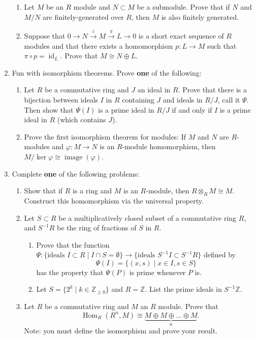 \documentclass[12pt]{article}
\newcommand{\bbZ}{\mathbb{Z}}
\newcommand{\Hom}{\operatorname{Hom}}
\begin{document}
\begin{enumerate}
\begin{enumerate}
\item Let $M$ be an $R$ module and $N\subset M$ be a submodule. Prove
  that if $N$ and $M/N$ are finitely-generated over $R$, then $M$ is
  also finitely generated. 
\item Suppose that $0 \rightarrow N \xrightarrow{i} M \xrightarrow{\pi} L
  \rightarrow 0$ is a short exact sequence of $R$ modules and that
  there exists a homomorphism $p: L\rightarrow M$ such that $\pi \circ
  p = \operatorname{id}_L$. Prove that $M\cong N\oplus L$. 
\end{enumerate}
\item Fun with isomorphism theorems. Prove {\bf one} of the following: 
\begin{enumerate}
\item Let $R$ be a commutative ring and $J$ an ideal in $R$. Prove that there is a bijection between ideals
  $I$ in $R$ containing $J$ and ideals in $R/J$, call it $\Psi$. Then
  show that $\Psi(I)$ is a prime ideal in $R/J$ if and only if
  $I$ is a prime ideal in $R$ (which contains $J$). 
\item Prove the first isomorphism theorem for modules: If $M$ and $N$
  are $R$-modules and $\varphi: M\rightarrow N$ is an $R$-module
  homomorphism, then $M/\ker \varphi \cong
  \operatorname{image}(\varphi)$. 
\end{enumerate}
\item Complete {\bf one} of the following problems: 
\begin{enumerate}
\item Show that if $R$ is a ring and $M$ is an $R$-module, then
  $R\otimes_R M\cong M$. Construct this homomorphism via the universal
  property. 
\item Let $S\subset R$ be a multiplicatively closed subset of a
  commutative ring $R$, and $S^{-1}R$ be the ring of fractions of $S$
  in $R$.
  \begin{enumerate}
  \item Prove that the function $\Psi: \{\textrm{ideals } I \subset R
    \mid I \cap S = \emptyset\}\rightarrow \{\textrm{ideals } S^{-1}I
    \subset S^{-1}R\}$ defined by \[\Psi(I) = \{(x,s) \mid x\in I,
      s\in S\}\] has the property that $\Psi(P)$ is prime whenever $P$
    is. 
  \item Let $S=\{2^k \mid k\in \bbZ_{\geq 0}\}$ and $R=\bbZ$. List the
    prime ideals in $S^{-1}\bbZ$. 
  \end{enumerate}
\item Let $R$ be a commutative ring and $M$ an $R$ module. Prove that
  \[\Hom_R(R^n,M)\cong \underbrace{M\oplus M \oplus \dotsc \oplus
    M}_n.\] Note: you must define the isomorphism and prove your
result.
\end{enumerate}



\end{enumerate}
\end{document}

